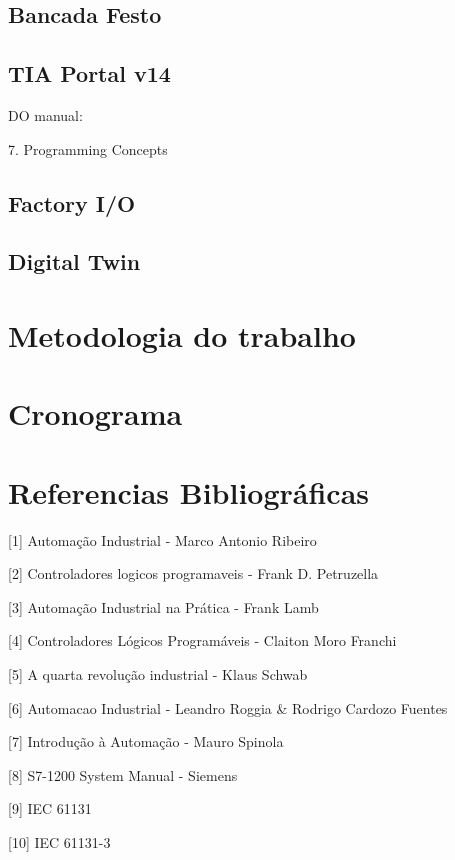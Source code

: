 \documentclass[a4paper, 12pt]{article}
\begin{document}
	\subsection{Bancada Festo}
	
	\subsection{TIA Portal v14}
	
		DO manual:
		
		7. Programming Concepts
	
	\subsection{Factory I/O}
	
	\subsection{Digital Twin}

\section{Metodologia do trabalho}

\section{Cronograma}

\section{Referencias Bibliográficas}

[1] Automação Industrial - Marco Antonio Ribeiro

[2] Controladores logicos programaveis - Frank D. Petruzella

[3] Automação Industrial na Prática - Frank Lamb

[4] Controladores Lógicos Programáveis - Claiton Moro Franchi

[5] A quarta revolução industrial - Klaus Schwab

[6] Automacao Industrial - Leandro Roggia \& Rodrigo Cardozo Fuentes

[7] Introdução à Automação - Mauro Spinola

[8] S7-1200 System Manual - Siemens

[9] IEC 61131

[10] IEC 61131-3
\end{document}
